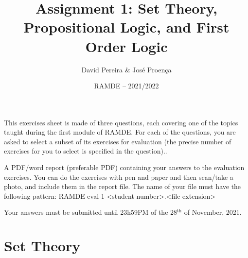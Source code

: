 \documentclass[11pt]{article}
\date{RAMDE -- 2021/2022}
\newcommand{\descrbox}[2]{
\begin{tcolorbox}[fonttitle=\sffamily\bfseries\Large\center, title=#1]
  {#2}
\end{tcolorbox}
}
\begin{document}
 
 
\title{Assignment 1: Set Theory, Propositional Logic, and First Order Logic}%

\author{David Pereira \& Jos\'{e} Proen\c{c}a} 


\maketitle

\vspace*{-5mm}

\descrbox{Rationale}{
This exercises sheet is made of three questions, each covering one of the topics taught during the first module of RAMDE. For each of the questions, you are asked to select a subset of its exercises for evaluation (the precise number of exercises for you to select is specified in the question)..
}


\descrbox{What to Submit}{A PDF/word report (preferable PDF) containing your answers to the evaluation exercises. You can do the exercises with pen and paper and then scan/take a photo, and include them in the report file. The name of your file must have the following pattern: RAMDE-eval-1-<student number>.<file extension>}


\descrbox{Deadline}{Your answers must be submitted until 23h59PM of the 28$^\text{th}$ of November, 2021.}





\section{Set Theory}
\end{document}
